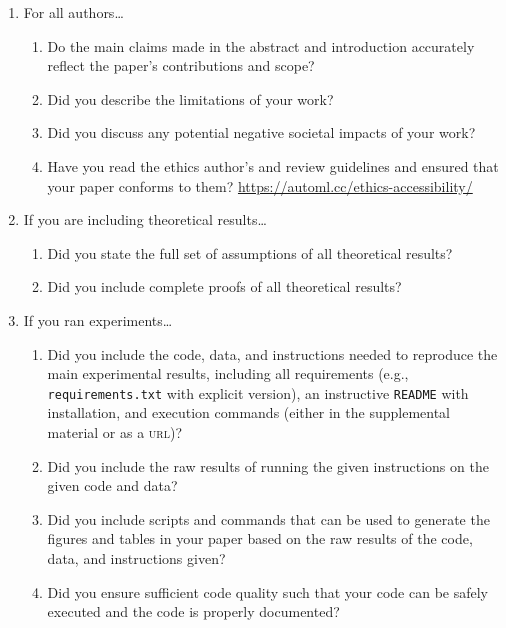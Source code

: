 \documentclass[11pt]{article}
\begin{document}
\begin{enumerate}
\item For all authors\dots
  \begin{enumerate}
  \item Do the main claims made in the abstract and introduction accurately
    reflect the paper's contributions and scope?
    \answerTODO{}
  \item Did you describe the limitations of your work?
    \answerTODO{}
  \item Did you discuss any potential negative societal impacts of your work?
    \answerTODO{}
  \item Have you read the ethics author's and review guidelines and ensured that your paper
    conforms to them? \url{https://automl.cc/ethics-accessibility/}
    \answerTODO{}
  \end{enumerate}
\item If you are including theoretical results\dots
  \begin{enumerate}
  \item Did you state the full set of assumptions of all theoretical results?
    \answerTODO{}
  \item Did you include complete proofs of all theoretical results?
    \answerTODO{}
  \end{enumerate}
\item If you ran experiments\dots
  \begin{enumerate}
  \item Did you include the code, data, and instructions needed to reproduce the
    main experimental results, including all requirements (e.g.,
    \texttt{requirements.txt} with explicit version), an instructive
    \texttt{README} with installation, and execution commands (either in the
    supplemental material or as a \textsc{url})?
    \answerTODO{}
  \item Did you include the raw results of running the given instructions on the
    given code and data?
    \answerTODO{}
  \item Did you include scripts and commands that can be used to generate the
    figures and tables in your paper based on the raw results of the code, data,
    and instructions given?
    \answerTODO{}
  \item Did you ensure sufficient code quality such that your code can be safely
    executed and the code is properly documented?

\end{enumerate}
\end{enumerate}
\end{document}
